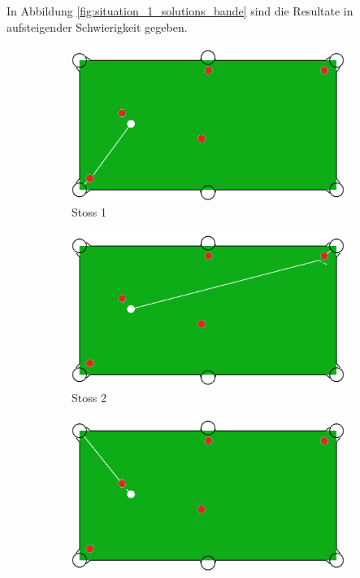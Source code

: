 In Abbildung \ref{fig:situation_1_solutions_bande} sind die Resultate in aufsteigender Schwierigkeit gegeben.

\begin{figure}[h!]
    \centering
    \begin{subfigure}[b]{0.3\textwidth}
        \centering
        \includegraphics[width=1.0\linewidth]{../common/04_results/resources/simple_search/situation_diverse_solution_rail_1.PNG}
        \caption{Stoss 1}
        \label{fig:situation_rail_1_solution_1}
    \end{subfigure}
    \hfill
    \begin{subfigure}[b]{0.3\textwidth}
        \centering
        \includegraphics[width=1.0\linewidth]{../common/04_results/resources/simple_search/situation_diverse_solution_rail_2.PNG}
        \caption{Stoss 2}
        \label{fig:situation_rail_1_solution_2}
    \end{subfigure}
    \hfill
    \begin{subfigure}[b]{0.3\textwidth}
        \centering
        \includegraphics[width=1.0\linewidth]{../common/04_results/resources/simple_search/situation_diverse_solution_rail_3.PNG}

\end{subfigure}
\end{figure}

